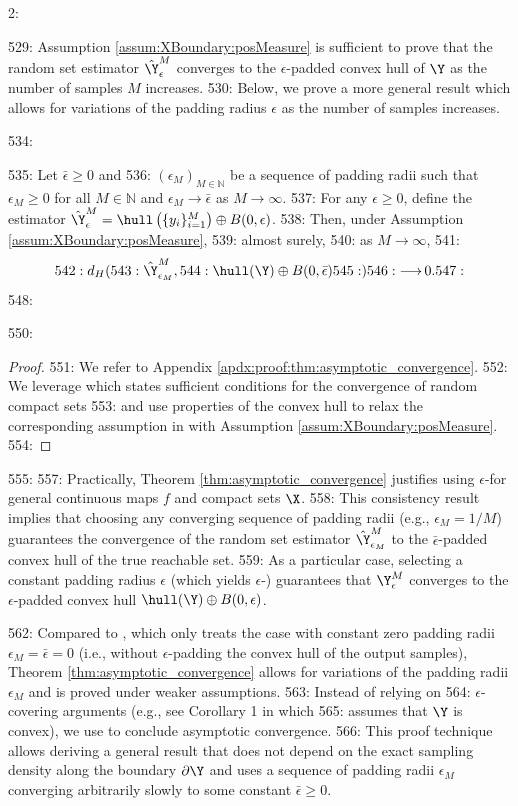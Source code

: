 2: \documentclass[12pt]{l4dc2022} %
\begin{document}
529: Assumption \ref{assum:XBoundary:posMeasure} is sufficient to prove that the random set estimator $\hat\Y_\epsilon^M$ converges to the $\epsilon$-padded convex hull of $\Y$ as the number of samples $M$ increases. 
530: Below, we prove a more general result which allows for variations of the padding radius $\epsilon$ as the number of samples increases. 

534: \begin{thm}\label{thm:asymptotic_convergence}
535: Let $\bar{\epsilon}\geq 0$ and 
536: $(\epsilon_M)_{M\in\mathbb{N}}$ be a sequence of padding radii such that $\epsilon_M\geq 0$ for all $M\in\mathbb{N}$ and $\epsilon_M\rightarrow \bar{\epsilon}$ as $M\rightarrow\infty$. 
537: For any $\epsilon\geq 0$, define the estimator $\hat\Y^M_{\epsilon}=\hull\left(\{y_i\}_{i{=}1}^M\right)\oplus B(0,\epsilon)$.  
538: Then, under Assumption \ref{assum:XBoundary:posMeasure}, 
539: almost surely, 
540: as $M\rightarrow\infty$, 
541: $$
542: d_H(
543: \hat\Y_{\epsilon_M}^M, 
544: \hull(\Y)\oplus B(0,\bar{\epsilon})
545: )
546: \mathop{\longrightarrow} 0.
547: $$
548: \end{thm}

550: \begin{proof}
551: We refer to Appendix \ref{apdx:proof:thm:asymptotic_convergence}. 
552: We leverage \citep[Proposition 1.7.23]{Molchanov_BookTheoryOfRandomSets2017} which states sufficient conditions for the convergence of random compact sets %
553: and use properties of the convex hull to relax the corresponding assumption in \citep{LewPavone2020} with Assumption  \ref{assum:XBoundary:posMeasure}. 
554: \end{proof}
555: \vspace{-3mm}
557: Practically, Theorem \ref{thm:asymptotic_convergence} justifies using $\epsilon$-\randup for general continuous maps $f$ and compact sets $\X$. 
558: This consistency result implies that choosing any converging sequence of padding radii (e.g., $\epsilon_M=1/M$) guarantees the convergence of the random set estimator $\hat\Y_{\epsilon_M}^M$  to the $\bar{\epsilon}$-padded convex hull of the true reachable set. 
559: As a particular case, selecting a constant padding radius $\epsilon$ (which yields $\epsilon$-\randup) guarantees that $\Y_{\epsilon}^M$ converges to the $\epsilon$-padded convex hull $\hull(\Y)\oplus B(0,\epsilon)$.  

562: Compared to \citep[Theorem 2]{LewPavone2020}, which only treats the case with constant zero padding radii $\epsilon_M=\bar\epsilon=0$ (i.e., without $\epsilon$-padding the convex hull of the output samples), Theorem \ref{thm:asymptotic_convergence} allows for variations of the padding radii $\epsilon_M$ and is proved under weaker assumptions. 
563: Instead of relying on %
564: $\epsilon$-covering arguments (e.g., see Corollary 1 in \citep{Dumbgen1996} which %
565: assumes that $\Y$ is convex), we use \citep[Proposition 1.7.23]{Molchanov_BookTheoryOfRandomSets2017}  to conclude asymptotic convergence. 
566: This proof technique allows deriving a general result that does not depend on the exact sampling density along the boundary $\partial\Y$ and uses a sequence of padding radii $\epsilon_M$ converging arbitrarily slowly to some constant $\bar{\epsilon}\geq 0$. 
\end{document}
